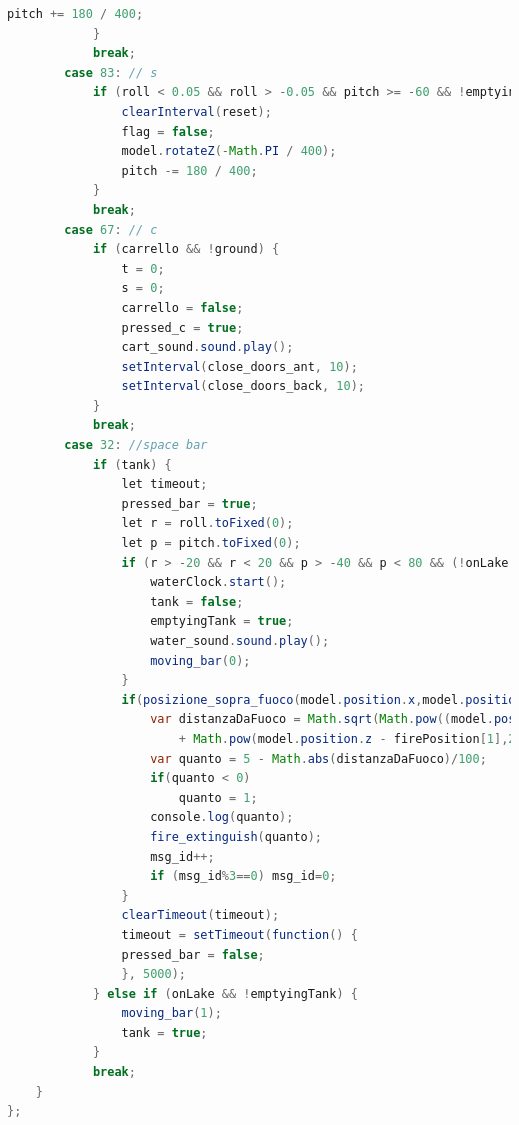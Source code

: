 \documentclass{article}
\begin{document}
\begin{lstlisting}[language=Java, caption=Manage commands]
                pitch += 180 / 400;
            }
            break;
        case 83: // s
            if (roll < 0.05 && roll > -0.05 && pitch >= -60 && !emptyingTank && (!ground || vel > 150)) {
                clearInterval(reset);
                flag = false;
                model.rotateZ(-Math.PI / 400);
                pitch -= 180 / 400;
            }
            break;
        case 67: // c
            if (carrello && !ground) {
                t = 0;
                s = 0;
                carrello = false;
                pressed_c = true;
                cart_sound.sound.play();
                setInterval(close_doors_ant, 10);
                setInterval(close_doors_back, 10);
            }
            break;
        case 32: //space bar
            if (tank) {
                let timeout;
                pressed_bar = true;
                let r = roll.toFixed(0);
                let p = pitch.toFixed(0);
                if (r > -20 && r < 20 && p > -40 && p < 80 && (!onLake || height > height_difficulty)) {
                    waterClock.start();
                    tank = false;
                    emptyingTank = true;
                    water_sound.sound.play();
                    moving_bar(0);
                }
                if(posizione_sopra_fuoco(model.position.x,model.position.z)){
                    var distanzaDaFuoco = Math.sqrt(Math.pow((model.position.x - firePosition[0]),2)
                        + Math.pow(model.position.z - firePosition[1],2));
                    var quanto = 5 - Math.abs(distanzaDaFuoco)/100;
                    if(quanto < 0)
                        quanto = 1;
                    console.log(quanto);
                    fire_extinguish(quanto);
                    msg_id++;
                    if (msg_id%3==0) msg_id=0;
                }
                clearTimeout(timeout);
                timeout = setTimeout(function() {
                pressed_bar = false; 
                }, 5000);
            } else if (onLake && !emptyingTank) {
                moving_bar(1);
                tank = true;
            }
            break;
    }
};
\end{lstlisting}
 
\end{document}
